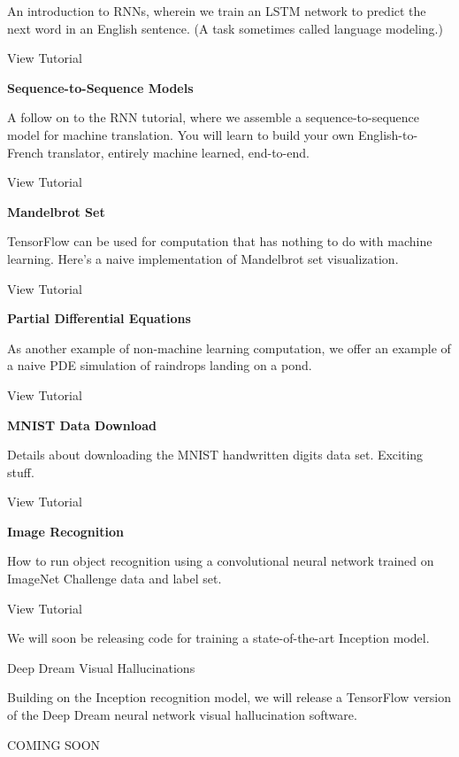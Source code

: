 An introduction to RNNs, wherein we train an LSTM network to predict the next word in an English sentence. (A task sometimes called language modeling.)

View Tutorial

\textbf{Sequence-to-Sequence Models}

A follow on to the RNN tutorial, where we assemble a sequence-to-sequence model for machine translation. You will learn to build your own English-to-French translator, entirely machine learned, end-to-end.

View Tutorial

\textbf{Mandelbrot Set}

TensorFlow can be used for computation that has nothing to do with machine learning. Here's a naive implementation of Mandelbrot set visualization.

View Tutorial

\textbf{Partial Differential Equations}

As another example of non-machine learning computation, we offer an example of a naive PDE simulation of raindrops landing on a pond.

View Tutorial

\textbf{MNIST Data Download}

Details about downloading the MNIST handwritten digits data set. Exciting stuff.

View Tutorial

\textbf{Image Recognition}

How to run object recognition using a convolutional neural network trained on ImageNet Challenge data and label set.

View Tutorial

We will soon be releasing code for training a state-of-the-art Inception model.

Deep Dream Visual Hallucinations

Building on the Inception recognition model, we will release a TensorFlow version of the Deep Dream neural network visual hallucination software.

COMING SOON